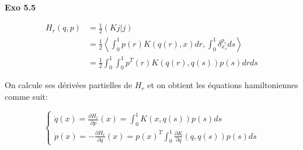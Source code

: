 \documentclass[11pt]{article}
\begin{document}
    \textbf{Exo 5.5}

    \vspace{-5em}
    \begin{align*} 
      H_r(q,p) &= \frac{1}{2} (Kj | j) \\
      &= \frac{1}{2} \left \langle \int_0^1 p(r) K(q(r), x) dr, \int_0^1 \delta_{x_s}^{p_s} ds  \right \rangle  \\
      &= \frac{1}{2} \int_0^1 \int_0^1 p^T (r) K(q(r), q(s)) p(s) dr ds 
    \end{align*}
    \vspace{-3em}

    On calcule ses dérivées partielles de $H_r$ et on obtient les équations hamiltoniennes comme suit:

    \vspace{-2em}
    $$
    \begin{cases} 
    \dot{q} (x) = \frac{\partial H_r}{\partial p} (x) = \int_0^1 K(x, q(s)) p(s) ds\\
    \dot{p} (x) = -\frac{\partial H_r}{\partial q} (x) = p(x)^T \int_0^1 \frac{\partial K}{\partial q} (q, q(s)) p(s) ds
    \end{cases}
    $$
    \vspace{-2em}


    
\end{document}
